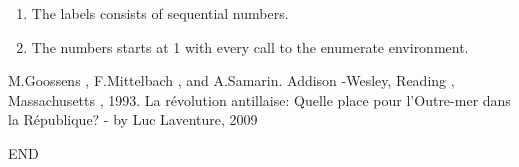 \documentclass{report}
\begin{document}
\begin{enumerate}
  \item The labels consists of sequential numbers.
  \item The numbers starts at 1 with every call to the enumerate environment.
\end{enumerate}

\begin{thebibliography}{9}
M.Goossens , F.Mittelbach , and A.Samarin.
Addison -Wesley, Reading , Massachusetts , 1993.
La révolution antillaise: Quelle place pour l'Outre-mer dans la République? - by Luc Laventure, 2009
\end{thebibliography}


END
  
\end{document}
